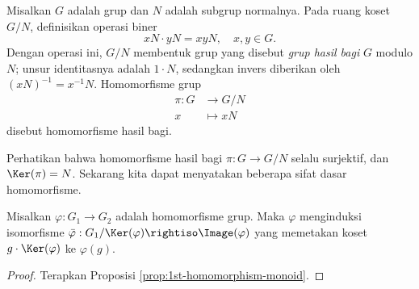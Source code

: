 \begin{definition}
	Misalkan $G$ adalah grup dan $N$ adalah subgrup normalnya. Pada ruang koset $G/N$, definisikan operasi biner
	\[ xN \cdot yN = xy N, \quad x,y \in G. \]
	Dengan operasi ini, $G/N$ membentuk grup yang disebut \emph{grup hasil bagi} $G$ modulo $N$; unsur identitasnya adalah $1 \cdot N$, sedangkan invers diberikan oleh $(xN)^{-1} = x^{-1}N$. Homomorfisme grup
	\begin{align*}
		\pi: G & \longrightarrow G/N \\
		x & \longmapsto xN
	\end{align*}
	disebut homomorfisme hasil bagi.
\end{definition}
Perhatikan bahwa homomorfisme hasil bagi $\pi: G \to G/N$ selalu surjektif, dan $\Ker(\pi) = N$. Sekarang kita dapat menyatakan beberapa sifat dasar homomorfisme.

\begin{proposition}\label{prop:1st-homomorphism}
	Misalkan $\varphi: G_1 \to G_2$ adalah homomorfisme grup. Maka $\varphi$ menginduksi isomorfisme $\bar{\varphi}: G_1/\Ker(\varphi) \rightiso \Image(\varphi)$ yang memetakan koset $g \cdot \Ker(\varphi)$ ke $\varphi(g)$.
\end{proposition}
\begin{proof}
	Terapkan Proposisi \ref{prop:1st-homomorphism-monoid}.
\end{proof}

